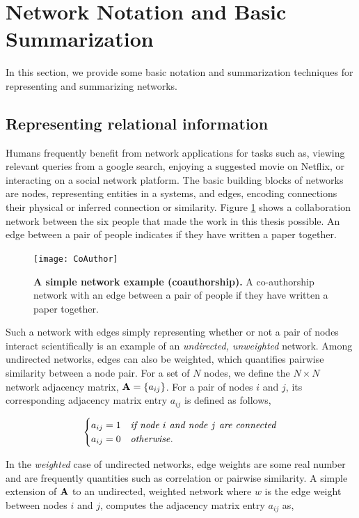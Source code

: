 \section{Network Notation and Basic Summarization}
In this section, we provide some basic notation and summarization techniques for representing and summarizing networks. 

\subsection{Representing relational information}

Humans frequently benefit from network applications for tasks such as, viewing relevant queries from a google search, enjoying a suggested movie on Netflix, or interacting on a social network platform. The basic building blocks of networks are nodes, representing entities in a systems, and edges, encoding connections their physical or inferred connection or similarity. Figure \ref{fig:social} shows a collaboration network between the six people that made the work in this thesis possible. An edge between a pair of people indicates if they have written a paper together. 
\begin{figure}[h!]
\begin{center}
\texttt{[image: CoAuthor]}
\caption{{\bf A simple network example (coauthorship).} A co-authorship network with an edge between a pair of people if they have written a paper together.}
\label{fig:social}
\end{center}
\end{figure}

Such a network with edges simply representing whether or not a pair of nodes interact scientifically is an example of an \emph{undirected, unweighted} network. Among undirected networks, edges can also be weighted, which quantifies pairwise similarity between a node pair. For a set of $N$ nodes, we define the $N \times N$ network adjacency matrix, ${\bf A}=\{a_{ij}\}$. For a pair of nodes $i$ and $j$, its corresponding adjacency matrix entry $a_{ij}$ is defined as follows,

\[ \begin{cases} 
     a_{ij}=1 & \text{\emph{if node $i$ and node $j$ are connected}} \\
      a_{ij}=0 & \text{\emph{otherwise}}.
         \end{cases}
\]

In the \emph{weighted} case of undirected networks, edge weights are some real number and are frequently quantities such as correlation or pairwise similarity. A simple extension of ${\bf A}$ to an undirected, weighted network where $w$ is the edge weight between nodes $i$ and $j$, computes the adjacency matrix entry $a_{ij}$ as, 

